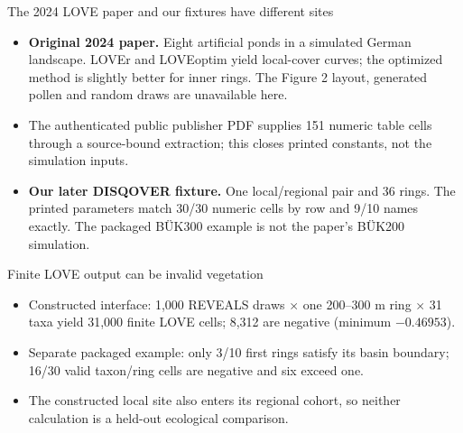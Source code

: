 \begin{frame}{The 2024 LOVE paper and our fixtures have different sites}
\small
\begin{itemize}
\item \textbf{Original 2024 paper.} Eight artificial ponds in a simulated German landscape. LOVEr and LOVEoptim yield local-cover curves; the optimized method is slightly better for inner rings. The Figure 2 layout, generated pollen and random draws are unavailable here.
\item The authenticated public publisher PDF supplies 151 numeric table cells through a source-bound extraction; this closes printed constants, not the simulation inputs.
\item \textbf{Our later DISQOVER fixture.} One local/regional pair and 36 rings. The printed parameters match 30/30 numeric cells by row and 9/10 names exactly. The packaged B\"UK300 example is not the paper's B\"UK200 simulation.
\end{itemize}
\end{frame}

\begin{frame}{Finite LOVE output can be invalid vegetation}
\small
\begin{itemize}
\item Constructed interface: 1,000 REVEALS draws $\times$ one 200--300 m ring $\times$ 31 taxa yield 31,000 finite LOVE cells; 8,312 are negative (minimum $-0.46953$).
\item Separate packaged example: only 3/10 first rings satisfy its basin boundary; 16/30 valid taxon/ring cells are negative and six exceed one.
\item The constructed local site also enters its regional cohort, so neither calculation is a held-out ecological comparison.
\end{itemize}
\end{frame}

